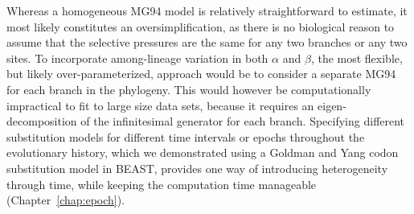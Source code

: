 Whereas a homogeneous MG94 model is relatively straightforward to estimate, it most likely constitutes an oversimplification, as there is no biological reason to assume that the selective pressures are the same for any two branches or any two sites.
To incorporate among-lineage variation in both $\alpha$ and $\beta$, the most flexible, but likely over-parameterized, approach would be to consider a separate MG94 for each branch in the phylogeny.
This would however be computationally impractical to fit to large size data sets, because it requires an eigen-decomposition of the infinitesimal generator for each branch.
Specifying different substitution models for different time intervals or epochs throughout the evolutionary history, which we demonstrated using a Goldman and Yang codon substitution model \cite{Goldman1994} in BEAST, provides one way of introducing heterogeneity through time, while keeping the computation time manageable (Chapter~\ref{chap:epoch}). 

